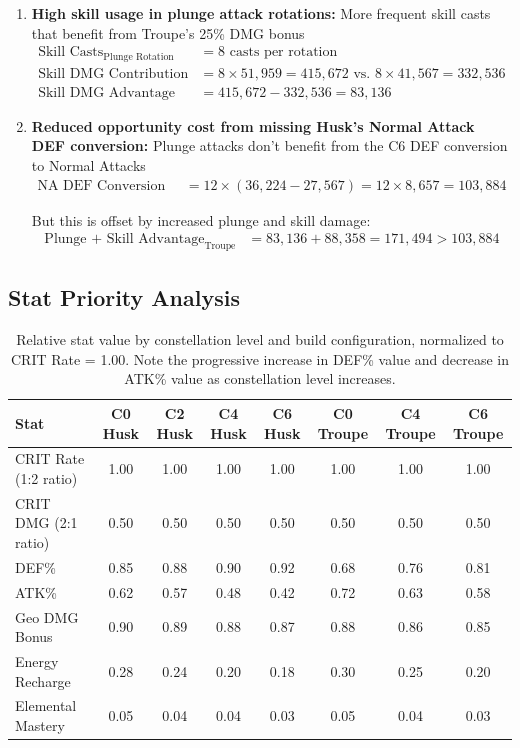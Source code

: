 \documentclass[12pt,a4paper]{article}
\begin{document}
\begin{enumerate}
    \item \textbf{High skill usage in plunge attack rotations:} More frequent skill casts that benefit from Troupe's 25\% DMG bonus
    \begin{align}
    \text{Skill Casts}_{\text{Plunge Rotation}} &= 8 \text{ casts per rotation} \\
    \text{Skill DMG Contribution} &= 8 \times 51,959 = 415,672 \text{ vs. } 8 \times 41,567 = 332,536 \\
    \text{Skill DMG Advantage} &= 415,672 - 332,536 = 83,136
    \end{align}
    
    \item \textbf{Reduced opportunity cost from missing Husk's Normal Attack DEF conversion:} Plunge attacks don't benefit from the C6 DEF conversion to Normal Attacks
    \begin{align}
    \text{NA DEF Conversion Loss} &= 12 \times (36,224 - 27,567) = 12 \times 8,657 = 103,884
    \end{align}
    
    But this is offset by increased plunge and skill damage:
    \begin{align}
    \text{Plunge + Skill Advantage}_{\text{Troupe}} &= 83,136 + 88,358 = 171,494 > 103,884
    \end{align}
\end{enumerate}

\subsection{Stat Priority Analysis}

\begin{table}[h]
\centering
\begin{tabular}{lccccccc}
\toprule
\textbf{Stat} & \textbf{C0 Husk} & \textbf{C2 Husk} & \textbf{C4 Husk} & \textbf{C6 Husk} & \textbf{C0 Troupe} & \textbf{C4 Troupe} & \textbf{C6 Troupe} \\
\midrule
CRIT Rate (1:2 ratio) & 1.00 & 1.00 & 1.00 & 1.00 & 1.00 & 1.00 & 1.00 \\
CRIT DMG (2:1 ratio) & 0.50 & 0.50 & 0.50 & 0.50 & 0.50 & 0.50 & 0.50 \\
DEF\% & 0.85 & 0.88 & 0.90 & 0.92 & 0.68 & 0.76 & 0.81 \\
ATK\% & 0.62 & 0.57 & 0.48 & 0.42 & 0.72 & 0.63 & 0.58 \\
Geo DMG Bonus & 0.90 & 0.89 & 0.88 & 0.87 & 0.88 & 0.86 & 0.85 \\
Energy Recharge & 0.28 & 0.24 & 0.20 & 0.18 & 0.30 & 0.25 & 0.20 \\
Elemental Mastery & 0.05 & 0.04 & 0.04 & 0.03 & 0.05 & 0.04 & 0.03 \\
\bottomrule
\end{tabular}
\caption{Relative stat value by constellation level and build configuration, normalized to CRIT Rate = 1.00. Note the progressive increase in DEF\% value and decrease in ATK\% value as constellation level increases.}
\label{tab:stat_priority}
\end{table}
\end{document}
